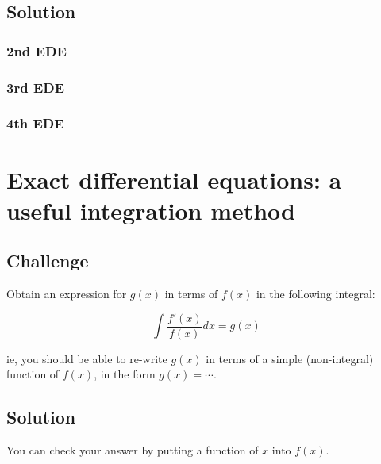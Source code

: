 \subsection*{Solution}

\subsubsection{2nd EDE}
\six{}


\subsubsection{3rd EDE}
\six{}


\subsubsection{4th EDE}
\six{}


\timebox




\newpage
\section{Exact differential equations: a useful integration method}

\subsection*{Challenge}
Obtain an expression for $g(x)$ in terms of $f(x)$ in the following integral:

\begin{equation}
    \int \frac{f'(x)}{f(x)} dx = g(x)
\end{equation}

ie, you should be able to re-write $g(x)$ in terms of a simple (non-integral) function of $f(x)$, in the form $g(x) = \cdots$.

\subsection*{Solution}
You can check your answer by putting a function of $x$ into $f(x)$.

\timebox




\newpage
